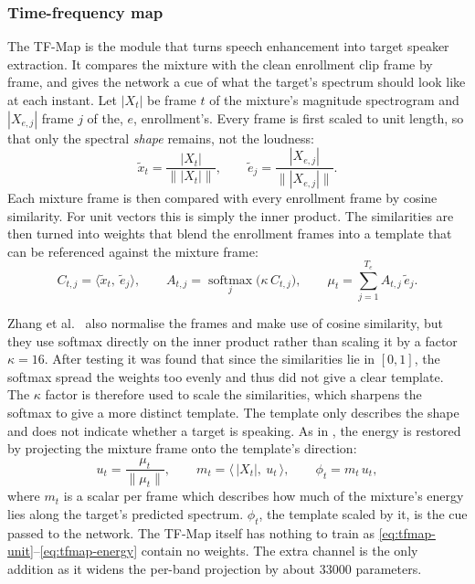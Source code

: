 \subsubsection{Time-frequency map}
\label{sec:tfmap}
The TF-Map \cite{zhang2025multi} is the module that turns speech enhancement into target speaker extraction. It compares the mixture with the clean enrollment clip frame by frame, and gives the network a cue of what the target's spectrum should look like at each instant. Let $|X_t|$ be frame $t$ of the mixture's magnitude spectrogram and $|X_{e,j}|$ frame $j$ of the, $e$, enrollment's. Every frame is first scaled to unit length, so that only the spectral \emph{shape} remains, not the loudness:
  \begin{equation}
  \tilde{x}_t = \frac{|X_t|}{\big\lVert |X_t| \big\rVert},
  \qquad
  \tilde{e}_j = \frac{|X_{e,j}|}{\big\lVert |X_{e,j}| \big\rVert}.
  \label{eq:tfmap-unit}
  \end{equation}
  Each mixture frame is then compared with every enrollment frame by cosine similarity. For unit vectors this is simply the inner product. The similarities are then turned into weights that blend the enrollment frames into a template that can be referenced against the mixture frame:
  \begin{equation} 
  C_{t,j} = \big\langle \tilde{x}_t,\ \tilde{e}_j \big\rangle,
  \qquad
  A_{t,j} = \operatorname*{softmax}_{j} \big( \kappa\, C_{t,j} \big),
  \qquad
  \mu_t = \sum_{j=1}^{T_e} A_{t,j}\, \tilde{e}_j .
  \label{eq:tfmap-cos}
  \end{equation}

  Zhang et al.\ \cite{zhang2025multi} also normalise the frames and make use of cosine similarity, but they use softmax directly on the inner product rather than scaling it by a factor $\kappa = 16$. After testing it was found that since the similarities lie in $[0, 1]$, the softmax spread the weights too evenly and thus did not give a clear template. The $\kappa$ factor is therefore used to scale the similarities, which sharpens the softmax to give a more distinct template. The template only describes the shape and does not indicate whether a target is speaking. As in \cite{zhang2025multi}, the energy is restored by projecting the mixture frame onto the template's direction:
  \begin{equation}
  u_t = \frac{\mu_t}{\lVert \mu_t \rVert},
  \qquad
  m_t = \big\langle\, |X_t|,\ u_t \,\big\rangle,
  \qquad
  \phi_t = m_t\, u_t ,
  \label{eq:tfmap-energy}
  \end{equation}
  where $m_t$ is a scalar per frame which describes how much of the mixture's energy lies along the target's predicted spectrum.  $\phi_t$, the template scaled by it, is the cue passed to the network. The TF-Map itself has nothing to train as \eqref{eq:tfmap-unit}--\eqref{eq:tfmap-energy} contain no weights. The extra channel is the only addition as it widens the per-band projection by about \num{33000} parameters.


